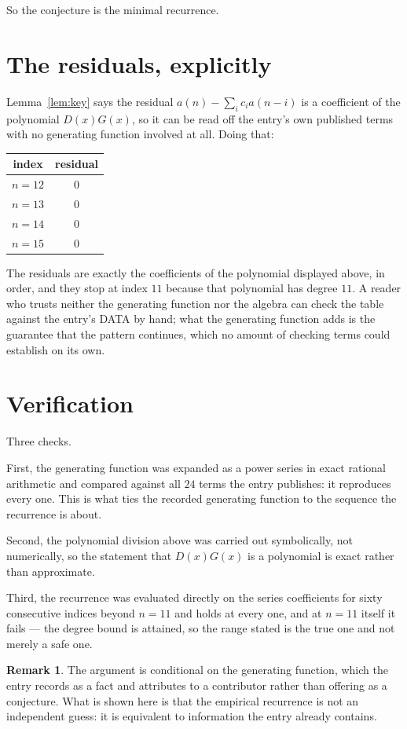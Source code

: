 \documentclass[11pt,a4paper]{article}
\theoremstyle{plain}
\theoremstyle{definition}
\newtheorem{remark}[theorem]{Remark}
\begin{document}
So the conjecture is the minimal recurrence.

\section{The residuals, explicitly}

Lemma~\ref{lem:key} says the residual $a(n)-\sum_ic_ia(n-i)$ is a coefficient of the
polynomial $D(x)G(x)$, so it can be read off the entry's own published terms with no
generating function involved at all. Doing that:
\begin{center}
\begin{tabular}{cc}
index & residual \\ \hline
$n=12$ & $0$ \\
$n=13$ & $0$ \\
$n=14$ & $0$ \\
$n=15$ & $0$
\end{tabular}
\end{center}
The residuals are exactly the coefficients of the polynomial displayed above, in order, and
they stop at index $11$ because that polynomial has degree $11$. A reader who trusts
neither the generating function nor the algebra can check the table against the entry's DATA
by hand; what the generating function adds is the guarantee that the pattern continues, which
no amount of checking terms could establish on its own.

\section{Verification}

Three checks.

First, the generating function was expanded as a power series in exact rational arithmetic and
compared against all $24$ terms the entry publishes: it reproduces every one. This is
what ties the recorded generating function to the sequence the recurrence is about.

Second, the polynomial division above was carried out symbolically, not numerically, so the
statement that $D(x)G(x)$ is a polynomial is exact rather than approximate.

Third, the recurrence was evaluated directly on the series coefficients for sixty consecutive
indices beyond $n=11$ and holds at every one, and at $n=11$ itself it fails --- the
degree bound is attained, so the range stated is the true one and not merely a safe one.

\begin{remark}
The argument is conditional on the generating function, which the entry records as a fact and
attributes to a contributor rather than offering as a conjecture. What is shown here is that
the empirical recurrence is not an independent guess: it is equivalent to information the
entry already contains.
\end{remark}
\end{document}
